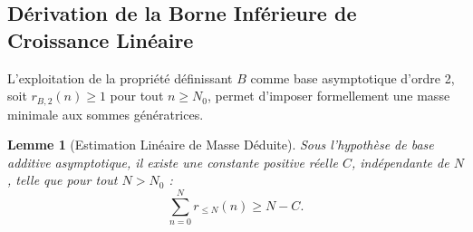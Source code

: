 \documentclass[12pt,a4paper]{article}
\newtheorem{lemma}[theorem]{Lemme}
\begin{document}
\subsection{D\'erivation de la Borne Inf\'erieure de Croissance Lin\'eaire}

L'exploitation de la propri\'et\'e d\'efinissant $B$ comme base asymptotique d'ordre 2, soit $r_{B,2}(n) \ge 1$ pour tout $n \ge N_0$, permet d'imposer formellement une masse minimale aux sommes g\'en\'eratrices.

\begin{lemma}[Estimation Lin\'eaire de Masse D\'eduite]
Sous l'hypoth\`ese de base additive asymptotique, il existe une constante positive r\'eelle $C$, ind\'ependante de $N$, telle que pour tout $N > N_0$ :
\begin{equation}
\sum_{n=0}^N r_{\le N}(n) \ge N - C.
\end{equation}
\end{lemma}
\end{document}
